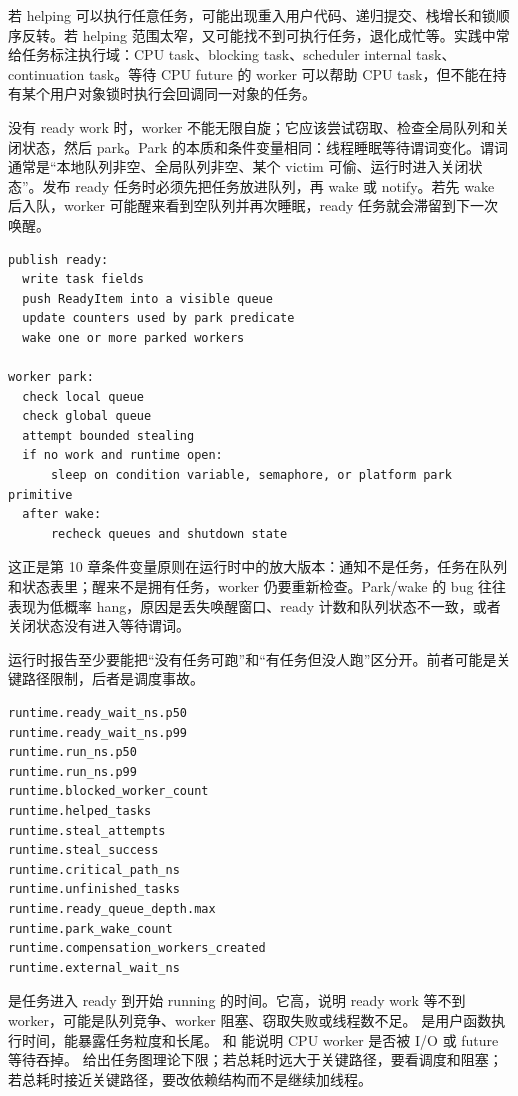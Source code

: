 若 helping 可以执行任意任务，可能出现重入用户代码、递归提交、栈增长和锁顺序反转。若 helping 范围太窄，又可能找不到可执行任务，退化成忙等。实践中常给任务标注执行域：CPU task、blocking task、scheduler internal task、continuation task。等待 CPU future 的 worker 可以帮助 CPU task，但不能在持有某个用户对象锁时执行会回调同一对象的任务。

没有 ready work 时，worker 不能无限自旋；它应该尝试窃取、检查全局队列和关闭状态，然后 park。Park 的本质和条件变量相同：线程睡眠等待谓词变化。谓词通常是“本地队列非空、全局队列非空、某个 victim 可偷、运行时进入关闭状态”。发布 ready 任务时必须先把任务放进队列，再 wake 或 notify。若先 wake 后入队，worker 可能醒来看到空队列并再次睡眠，ready 任务就会滞留到下一次唤醒。

\begin{lstlisting}[numbers=none,caption={ready 发布和 worker park 的顺序}]
publish ready:
  write task fields
  push ReadyItem into a visible queue
  update counters used by park predicate
  wake one or more parked workers

worker park:
  check local queue
  check global queue
  attempt bounded stealing
  if no work and runtime open:
      sleep on condition variable, semaphore, or platform park primitive
  after wake:
      recheck queues and shutdown state
\end{lstlisting}

这正是第 10 章条件变量原则在运行时中的放大版本：通知不是任务，任务在队列和状态表里；醒来不是拥有任务，worker 仍要重新检查。Park/wake 的 bug 往往表现为低概率 hang，原因是丢失唤醒窗口、ready 计数和队列状态不一致，或者关闭状态没有进入等待谓词。

运行时报告至少要能把“没有任务可跑”和“有任务但没人跑”区分开。前者可能是关键路径限制，后者是调度事故。

\begin{lstlisting}[numbers=none,caption={任务运行时的 trace 和汇总字段}]
runtime.ready_wait_ns.p50
runtime.ready_wait_ns.p99
runtime.run_ns.p50
runtime.run_ns.p99
runtime.blocked_worker_count
runtime.helped_tasks
runtime.steal_attempts
runtime.steal_success
runtime.critical_path_ns
runtime.unfinished_tasks
runtime.ready_queue_depth.max
runtime.park_wake_count
runtime.compensation_workers_created
runtime.external_wait_ns
\end{lstlisting}

 是任务进入 ready 到开始 running 的时间。它高，说明 ready work 等不到 worker，可能是队列竞争、worker 阻塞、窃取失败或线程数不足。 是用户函数执行时间，能暴露任务粒度和长尾。 和  能说明 CPU worker 是否被 I/O 或 future 等待吞掉。 给出任务图理论下限；若总耗时远大于关键路径，要看调度和阻塞；若总耗时接近关键路径，要改依赖结构而不是继续加线程。

